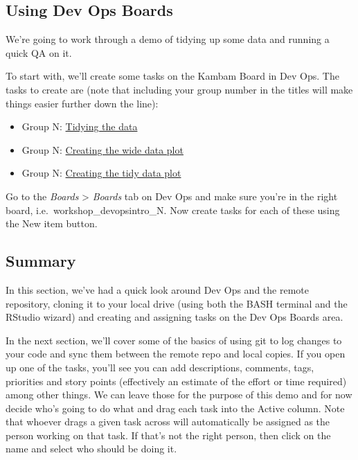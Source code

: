 \documentclass[
  12pt,
]{article}
\providecommand{\tightlist}{%
  \setlength{\itemsep}{0pt}\setlength{\parskip}{0pt}}
\begin{document}
\hypertarget{using-dev-ops-boards}{%
\subsection{Using Dev Ops Boards}\label{using-dev-ops-boards}}

We're going to work through a demo of tidying up some data and running a
quick QA on it.

To start with, we'll create some tasks on the Kambam Board in Dev Ops.
The tasks to create are (note that including your group number in the
titles will make things easier further down the line):

\begin{itemize}
\tightlist
\item
  Group N: \protect\hyperlink{tidying-the-data}{Tidying the data}
\item
  Group N: \protect\hyperlink{creating-the-wide-data-plot}{Creating the
  wide data plot}
\item
  Group N: \protect\hyperlink{creating-the-tidy-data-plot}{Creating the
  tidy data plot}
\end{itemize}

Go to the \emph{Boards} \textgreater{} \emph{Boards} tab on Dev Ops and
make sure you're in the right board, i.e.~workshop\_devopsintro\_N. Now
create tasks for each of these using the New item button.

\hypertarget{summary}{%
\subsection{Summary}\label{summary}}

In this section, we've had a quick look around Dev Ops and the remote
repository, cloning it to your local drive (using both the BASH terminal
and the RStudio wizard) and creating and assigning tasks on the Dev Ops
Boards area.

In the next section, we'll cover some of the basics of using git to log
changes to your code and sync them between the remote repo and local
copies. If you open up one of the tasks, you'll see you can add
descriptions, comments, tags, priorities and story points (effectively
an estimate of the effort or time required) among other things. We can
leave those for the purpose of this demo and for now decide who's going
to do what and drag each task into the Active column. Note that whoever
drags a given task across will automatically be assigned as the person
working on that task. If that's not the right person, then click on the
name and select who should be doing it.
\end{document}
